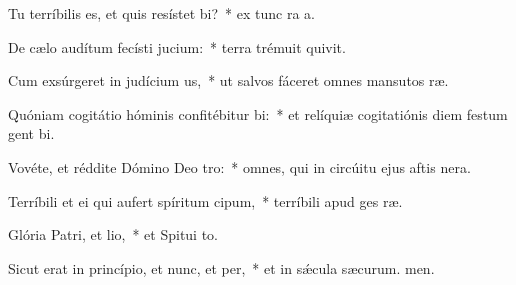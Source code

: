 \item Tu terríbilis es, et quis resístet bi?~* ex tunc ra a.
\item De cælo audítum fecísti jucium:~* terra trémuit  quivit.
\item Cum exsúrgeret in judícium us,~* ut salvos fáceret omnes mansutos ræ.
\item Quóniam cogitátio hóminis confitébitur bi:~* et relíquiæ cogitatiónis diem festum gent bi.
\item Vovéte, et réddite Dómino Deo tro:~* omnes, qui in circúitu ejus aftis nera.
\item Terríbili et ei qui aufert spíritum cipum,~* terríbili apud ges ræ.
\item Glória Patri, et lio,~* et Spitui to.
\item Sicut erat in princípio, et nunc, et per,~* et in sǽcula sæcurum. men.
